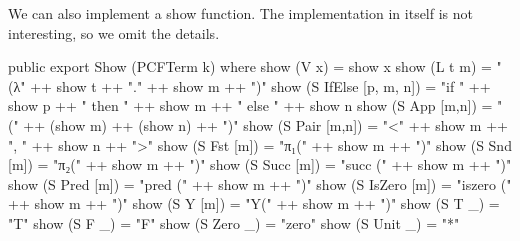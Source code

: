We can also implement a show function. The implementation in itself is not
interesting, so we omit the details.

\begin{hidden}
public export
Show (PCFTerm k) where
  show (V x)                = show x
  show (L t m)              = "(λ" ++ show t ++ "." ++ show m ++ ")"
  show (S IfElse [p, m, n]) = "if " ++ show p ++ " then " ++ show m ++ " else " ++ show n
  show (S App    [m,n])     = "(" ++ (show m) ++ (show n) ++ ")"
  show (S Pair   [m,n])     = "<" ++ show m ++ ", " ++ show n ++ ">"
  show (S Fst    [m])       = "π₁(" ++ show m ++ ")"
  show (S Snd    [m])       = "π₂(" ++ show m ++ ")"
  show (S Succ   [m])       = "succ (" ++ show m ++ ")"
  show (S Pred   [m])       = "pred (" ++ show m ++ ")"
  show (S IsZero [m])       = "iszero (" ++ show m ++ ")"
  show (S Y      [m])       = "Y(" ++ show m ++ ")"
  show (S T      _)         = "T"
  show (S F      _)         = "F"
  show (S Zero   _)         = "zero"
  show (S Unit   _)         = "*"
\end{hidden}

